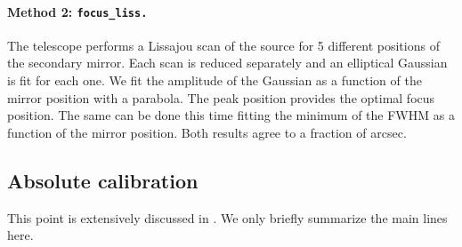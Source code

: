 \paragraph{Method 2: {\tt focus\_liss.}} The telescope performs a Lissajou scan of
the source for 5 different positions of the secondary mirror. Each scan is
reduced separately and an elliptical Gaussian is fit for each one. We fit the amplitude
of the Gaussian as a function of the mirror position with a parabola. The peak
position provides the optimal focus position. The same can be done this time
fitting the minimum of the FWHM as a function of the mirror position. Both
results agree to a fraction of arcsec.


\subsection{Absolute calibration}

This point is extensively discussed in \cite{catalano_2014}. We only briefly
summarize the main lines here. 
